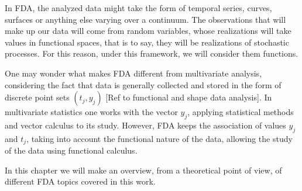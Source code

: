 In FDA, the analyzed data might take the form of temporal series, curves,
surfaces or anything else varying over a continuum.  The observations that will
make up our data will come from random variables, whose realizations will take
values in functional spaces, that is to say, they will be realizations of
stochastic processes. For this reason, under this framework, we will consider
them functions.

One may wonder what makes FDA different from multivariate analysis, considering
the fact that data is generally collected and stored in the form of discrete
point sets ${(t_j, y_j)}$ [Ref to functional and shape data analysis].  In
multivariate statistics one works with the vector ${y_j}$, applying statistical
methods and vector calculus to its study. However, FDA keeps the association of
values ${y_j}$ and ${t_j}$, taking into account the functional nature of the
data, allowing the study of the data using functional calculus.

In this chapter we will make an overview, from a theoretical point of view, of
different FDA topics covered in this work.
